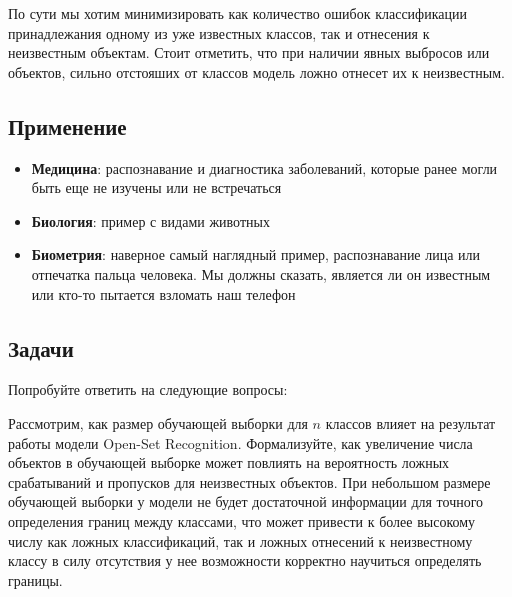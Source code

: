 По сути мы хотим минимизировать как количество ошибок классификации принадлежания одному из уже известных классов, так и отнесения к неизвестным объектам.
Стоит отметить, что при наличии явных выбросов или объектов, сильно отстояших от классов модель ложно отнесет их к неизвестным.

\subsection{Применение}
\begin{itemize}
    \item \textbf{Медицина}: распознавание и диагностика заболеваний, которые ранее могли быть еще не изучены или не встречаться
    \item \textbf{Биология}: пример с видами животных
    \item \textbf{Биометрия}: наверное самый наглядный пример, распознавание лица или отпечатка пальца человека. Мы должны сказать, является ли он известным или кто-то пытается взломать наш телефон
\end{itemize}

\subsection{Задачи}
Попробуйте ответить на следующие вопросы:

\problem Рассмотрим, как размер обучающей выборки для $n$ классов влияет на результат работы модели Open-Set Recognition. 
Формализуйте, как увеличение числа объектов в обучающей выборке может повлиять на вероятность ложных срабатываний и пропусков для неизвестных объектов.
\solution При небольшом размере обучающей выборки у модели не будет достаточной информации для точного определения границ между классами, что может привести к более высокому числу как ложных классификаций, так и ложных отнесений к неизвестному классу в силу отсутствия у нее возможности корректно научиться определять границы.

